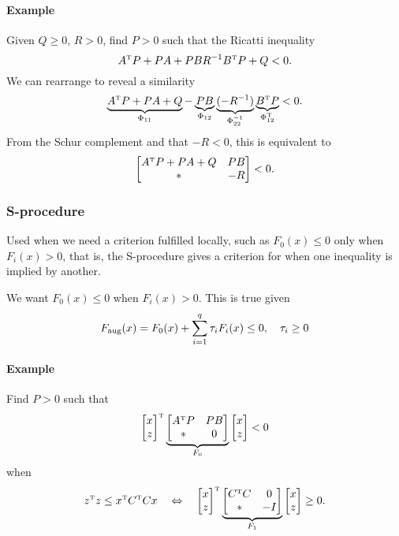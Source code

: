 \paragraph{Example} Given $Q \geq 0$, $R > 0$, find $P > 0$ such that the Ricatti inequality
%
\begin{equation}
  A\tp P + PA + PBR^{-1}B\tp P + Q < 0.
\end{equation}
%
We can rearrange to reveal a similarity
%
\begin{equation}
  \underbrace{A\tp P + PA + Q}_{\Phi_{11}}
  -
  \underbrace{PB}_{\Phi_{12}}
  \underbrace{(-R^{-1})}_{\Phi_{22}^{-1}}
  \underbrace{B\tp P}_{\Phi_{12}\tp}
  < 0.
\end{equation}
%
From the Schur complement and that $-R < 0$, this is equivalent to
%
\begin{equation}
  \begin{bmatrix}
    A\tp P + PA + Q & PB \\
    * & -R
  \end{bmatrix}
  < 0.
\end{equation}

\subsubsection{S-procedure}
Used when we need a criterion fulfilled locally, such as $F_0(x) \leq 0$ only when $F_i(x) > 0$, that is, the S-procedure gives a criterion for when one inequality is implied by another.

We want $F_0(x) \leq 0$ when $F_i(x) > 0$. This is true given
%
\begin{equation}
  F_\mathrm{aug}(x) = F_0(x) + \sum_{i=1}^q \tau_i F_i(x) \leq 0, \quad \tau_i \geq 0
\end{equation}

\paragraph{Example} Find $P>0$ such that
%
\begin{equation}
  \bmat{x \\ z}\tp
  \underbrace{\bmat{A\tp P & PB \\ * & 0}}_{F_0}
  \bmat{x \\ z}
  < 0
\end{equation}
%
when
%
\begin{equation}
  z\tp z \leq x\tp C\tp C x
  \quad \Leftrightarrow \quad
  \bmat{x \\ z}\tp
  \underbrace{\bmat{C\tp C & 0 \\ * & -I}}_{F_1}
  \bmat{x \\ z}
  \geq 0.
\end{equation}

